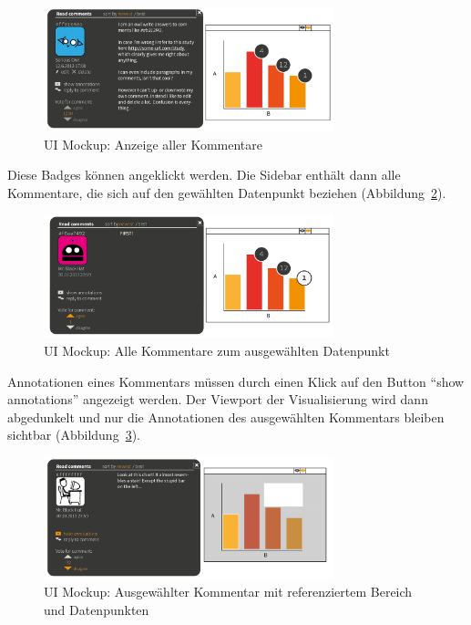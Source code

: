 \documentclass[
	headsepline,
	footsepline,
	fontsize=12pt,
	bibliography=totoc
]{scrbook}
\begin{document}
\begin{figure}[htbp]
   \centering
   \includegraphics[width=0.75\textwidth]{images/konzeption-kommentare-step2.png}
   \caption{UI Mockup: Anzeige aller Kommentare}
   \label{figure:kommentare-step2}
\end{figure}

Diese Badges können angeklickt werden. Die Sidebar enthält dann alle Kommentare, die sich auf den gewählten Datenpunkt beziehen (Abbildung~\ref{figure:kommentare-step3c}).

\begin{figure}[htbp]
   \centering
   \includegraphics[width=0.75\textwidth]{images/konzeption-kommentare-step3c.png}
   \caption{UI Mockup: Alle Kommentare zum ausgewählten Datenpunkt}
   \label{figure:kommentare-step3c}
\end{figure}

Annotationen eines Kommentars müssen durch einen Klick auf den Button \enquote{show annotations} angezeigt werden. Der Viewport der Visualisierung wird dann abgedunkelt und nur die Annotationen des ausgewählten Kommentars bleiben sichtbar (Abbildung~\ref{figure:kommentare-step3a}).

\begin{figure}[htbp]
   \centering
   \includegraphics[width=0.75\textwidth]{images/konzeption-kommentare-step3a.png}
   \caption{UI Mockup: Ausgewählter Kommentar mit referenziertem Bereich und Datenpunkten}
   \label{figure:kommentare-step3a}
\end{figure}
\end{document}
